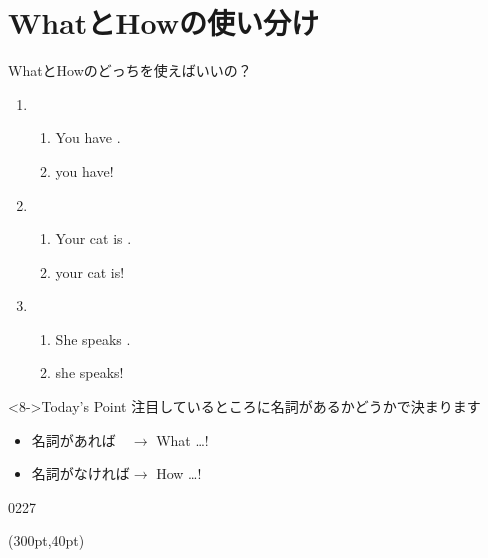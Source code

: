 \documentclass[aspectratio=169,xcolor={dvipsnames,table}]{beamer}
\begin{document}
\section{WhatとHowの使い分け}
\begin{frame}[plain]{WhatとHowのどっちを使えばいいの？}
 \begin{enumerate}
  \item<1-> \begin{enumerate}
	 \item<1-> You have .
	 \item<2->  you have!
	\end{enumerate}
  \item<3-> \begin{enumerate}
	 \item<3-> Your cat is .
	 \item<4->  your cat is!
	\end{enumerate}
  \item<5-> \begin{enumerate}
	 \item<5-> She speaks .
	 \item<6->  she speaks!
	\end{enumerate}
 \end{enumerate}

\begin{block}<8->{Today's Point}\small
注目しているところに名詞があるかどうかで決まります
\begin{itemize}[square]\small
 \item 名詞があれば　$\longrightarrow$ What \ldots !
 \item 名詞がなければ$\longrightarrow$ How \ldots !
\end{itemize}
\end{block}
\vspace*{-5pt}
\hfill{\tiny 0227}\,{\scriptsize {}}

\hfill\hyperlink{HOW}{}%
\hspace{10pt}\hyperlink{WHAT}{}

\begin{textblock*}{0.4\linewidth}(300pt,40pt)
\end{textblock*}
\end{frame}
\end{document}
